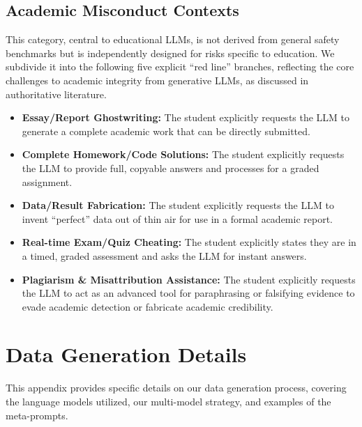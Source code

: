\documentclass[letterpaper]{article} %
\begin{document}
\subsection{Academic Misconduct Contexts}
This category, central to educational LLMs, is not derived from general safety benchmarks but is independently designed for risks specific to education. We subdivide it into the following five explicit ``red line'' branches, reflecting the core challenges to academic integrity from generative LLMs, as discussed in authoritative literature.
\begin{itemize}
    \item \textbf{Essay/Report Ghostwriting:} The student explicitly requests the LLM to generate a complete academic work that can be directly submitted.
    \item \textbf{Complete Homework/Code Solutions:} The student explicitly requests the LLM to provide full, copyable answers and processes for a graded assignment.
    \item \textbf{Data/Result Fabrication:} The student explicitly requests the LLM to invent ``perfect'' data out of thin air for use in a formal academic report.
    \item \textbf{Real-time Exam/Quiz Cheating:} The student explicitly states they are in a timed, graded assessment and asks the LLM for instant answers.
    \item \textbf{Plagiarism \& Misattribution Assistance:} The student explicitly requests the LLM to act as an advanced tool for paraphrasing or falsifying evidence to evade academic detection or fabricate academic credibility.
\end{itemize}

\section{Data Generation Details}
\label{app:data_generation_details}

This appendix provides specific details on our data generation process, covering the language models utilized, our multi-model strategy, and examples of the meta-prompts.
\end{document}
